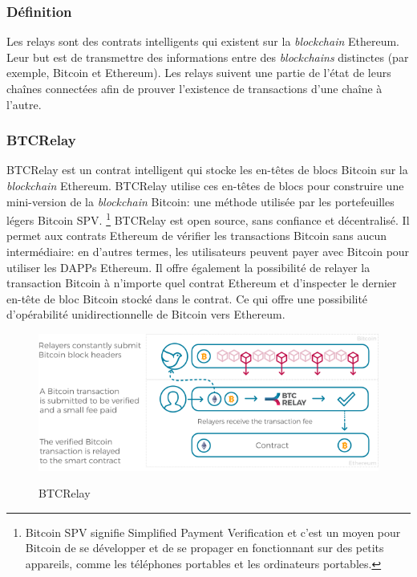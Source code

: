 \subsubsection{Définition}

Les relays sont des contrats intelligents qui existent sur la \textit{blockchain} Ethereum.
Leur but est de transmettre des informations entre des \textit{blockchains} distinctes (par exemple, Bitcoin et Ethereum). 
Les relays suivent une partie de l’état de leurs chaînes connectées afin de prouver l’existence de transactions d’une chaîne à l’autre.

\subsubsection{BTCRelay}

BTCRelay est un contrat intelligent qui stocke les en-têtes de blocs Bitcoin sur la \textit{blockchain} Ethereum.
BTCRelay utilise ces en-têtes de blocs pour construire une mini-version de la \textit{blockchain} Bitcoin: une méthode utilisée par les portefeuilles légers Bitcoin SPV. 
\footnote{Bitcoin SPV signifie Simplified Payment Verification et c’est un moyen pour Bitcoin de se développer et de se propager en fonctionnant sur des petits appareils, comme les téléphones portables et les ordinateurs portables.}
BTCRelay est open source, sans confiance et décentralisé. Il permet aux contrats Ethereum de vérifier les transactions Bitcoin sans aucun intermédiaire: en d’autres termes, 
les utilisateurs peuvent payer avec Bitcoin pour utiliser les DAPPs Ethereum. Il offre également la possibilité de relayer la transaction Bitcoin à n’importe quel contrat Ethereum et d’inspecter le dernier en-tête de bloc Bitcoin stocké dans le contrat. Ce qui offre une possibilité d'opérabilité unidirectionnelle de Bitcoin vers Ethereum.\\

\begin{figure}[h!]
  \centering
  \includegraphics[scale=0.5]{decentralisation/btcRelay.png}
  \label{fig:btcRelay}
  \caption{BTCRelay}
\end{figure}

